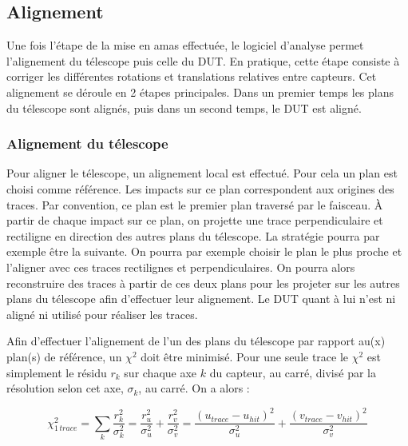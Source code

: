   \subsection{Alignement}
  \label{sect:alignement}
  
   Une fois l'\'etape de la mise en amas effectu\'ee, le logiciel d'analyse permet l'alignement du télescope puis celle du DUT. En  pratique, cette \'etape consiste \`a corriger les diff\'erentes rotations et translations relatives entre capteurs. Cet alignement se d\'eroule en 2 \'etapes principales. Dans un premier temps les plans du t\'elescope sont align\'es, puis dans un second temps, le DUT est align\'e.
   
    \subsubsection{Alignement du t\'elescope}
    
     Pour aligner le t\'elescope, un alignement local est effectu\'e. Pour cela un plan est choisi comme r\'ef\'erence. Les impacts sur ce plan correspondent aux origines des traces. Par convention, ce plan est le premier plan travers\'e par le faisceau. \`A partir de chaque impact sur ce plan, on projette une trace perpendiculaire et rectiligne en direction des autres plans du t\'elescope. La strat\'egie pourra par exemple \^etre la suivante. On pourra par exemple choisir le plan le plus proche et l'aligner avec ces traces rectilignes et perpendiculaires. On pourra alors reconstruire des traces \`a partir de ces deux plans pour les projeter sur les autres plans du t\'elescope afin d'effectuer leur alignement. Le DUT quant \`a lui n'est ni align\'e ni utilis\'e pour r\'ealiser les traces. 
     
     \medskip
     
     Afin d'effectuer l'alignement de l'un des plans du t\'elescope par rapport au(x) plan(s) de r\'ef\'erence, un $\chi^2$ doit \^etre minimis\'e. Pour une seule trace le $\chi^2$ est simplement le r\'esidu $r_k$ sur chaque axe $k$ du capteur, au carr\'e, divis\'e par la r\'esolution selon cet axe, $\sigma_k$, au carr\'e. On a alors :
     
     \begin{equation}
       \chi^2_{1 \, trace} = \sum_{k} \dfrac{r_k^2}{\sigma_k^2} = \dfrac{r_u^2}{\sigma_u^2} + \dfrac{r_v^2}{\sigma_v^2} = \dfrac{\left( u_{trace} - u_{hit} \right)^2}{\sigma_u^2} + \dfrac{\left( v_{trace} - v_{hit} \right)^2}{\sigma_v^2}
     \end{equation}
     
